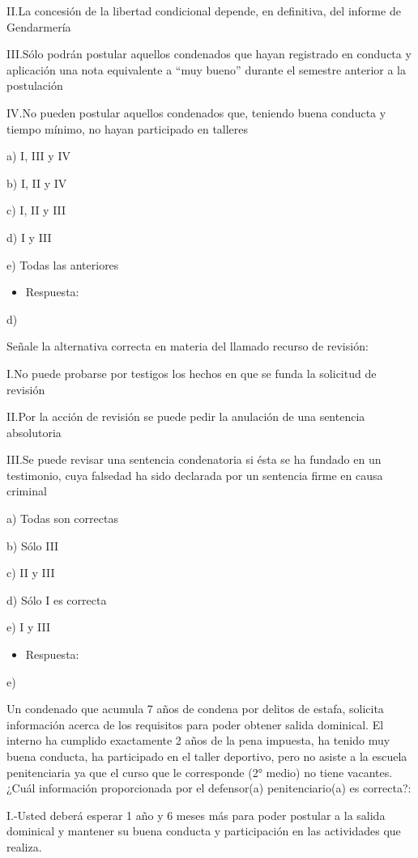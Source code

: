 \documentclass[letterpaper, 11pt]{article}
\begin{document}
II.La concesión de la libertad condicional depende, en definitiva, del informe de
Gendarmería

III.Sólo podrán postular aquellos condenados que hayan registrado en conducta y
aplicación una nota equivalente a “muy bueno” durante el semestre anterior a la
postulación

IV.No pueden postular aquellos condenados que, teniendo buena conducta y tiempo
mínimo, no hayan participado en talleres


a) I, III y IV

b) I, II y IV

c) I, II y III

d) I y III

e) Todas las anteriores

\begin{itemize}
\item Respuesta:
\end{itemize}
d)

Señale la alternativa correcta en materia del llamado recurso de revisión:

I.No puede probarse por testigos los hechos en que se funda la solicitud de revisión

II.Por la acción de revisión se puede pedir la anulación de una sentencia absolutoria

III.Se puede revisar una sentencia condenatoria si ésta se ha fundado en un
testimonio, cuya falsedad ha sido declarada por un sentencia firme en causa
criminal

a) Todas son correctas

b) Sólo III

c) II y III

d) Sólo I es correcta

e) I y III

\begin{itemize}
\item Respuesta:
\end{itemize}
e)


Un condenado que acumula 7 años de condena por delitos de estafa, solicita
información acerca de los requisitos para poder obtener salida dominical. El
interno ha cumplido exactamente 2 años de la pena impuesta, ha tenido muy
buena conducta, ha participado en el taller deportivo, pero no asiste a la escuela
penitenciaria ya que el curso que le corresponde (2° medio) no tiene vacantes.
¿Cuál información proporcionada por el defensor(a) penitenciario(a) es correcta?:

I.-Usted deberá esperar 1 año y 6 meses más para poder postular a la salida
dominical y mantener su buena conducta y participación en las actividades que
realiza.
\end{document}
